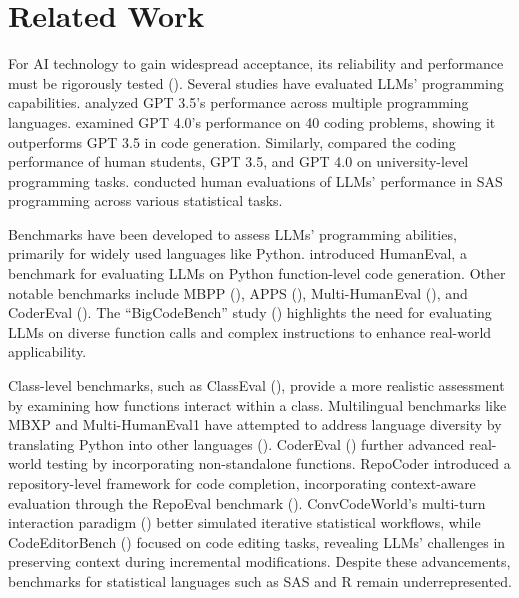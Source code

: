 \section{Related Work}

For AI technology to gain widespread acceptance, its reliability and performance must be rigorously tested (). Several studies have evaluated LLMs' programming capabilities.  analyzed GPT 3.5's performance across multiple programming languages.  examined GPT 4.0's performance on 40 coding problems, showing it outperforms GPT 3.5 in code generation. Similarly,  compared the coding performance of human students, GPT 3.5, and GPT 4.0 on university-level programming tasks.  conducted human evaluations of LLMs' performance in SAS programming across various statistical tasks.

Benchmarks have been developed to assess LLMs' programming abilities, primarily for widely used languages like Python.  introduced HumanEval, a benchmark for evaluating LLMs on Python function-level code generation. Other notable benchmarks include MBPP (), APPS (), Multi-HumanEval (), and CoderEval (). The ``BigCodeBench'' study () highlights the need for evaluating LLMs on diverse function calls and complex instructions to enhance real-world applicability.

Class-level benchmarks, such as ClassEval (), provide a more realistic assessment by examining how functions interact within a class. Multilingual benchmarks like MBXP and Multi-HumanEval1 have attempted to address language diversity by translating Python into other languages (). CoderEval () further advanced real-world testing by incorporating non-standalone functions. RepoCoder introduced a repository-level framework for code completion, incorporating context-aware evaluation through the RepoEval benchmark (). ConvCodeWorld's multi-turn interaction paradigm () better simulated iterative statistical workflows, while CodeEditorBench () focused on code editing tasks, revealing LLMs' challenges in preserving context during incremental modifications. Despite these advancements, benchmarks for statistical languages such as SAS and R remain underrepresented.



